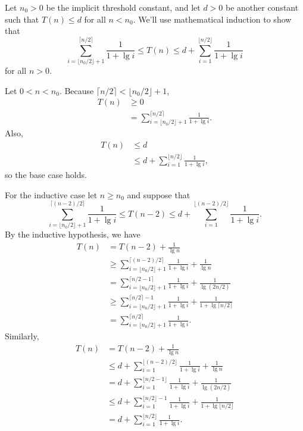 Let $n_0>0$ be the implicit threshold constant, and let $d>0$ be another constant such that $T(n)\le d$ for all $n<n_0$.
We'll use mathematical induction to show that
\[
    \sum_{i=\lfloor n_0/2\rfloor+1}^{\lceil n/2\rceil}\frac{1}{1+\lg i} \le T(n) \le d+\sum_{i=1}^{\lfloor n/2\rfloor}\frac{1}{1+\lg i}
\]
for all $n>0$.

Let $0<n<n_0$.
Because $\lceil n/2\rceil<\lfloor n_0/2\rfloor+1$,
\begin{align*}
    T(n) &\ge 0 \\
    &= \sum_{i=\lfloor n_0/2\rfloor+1}^{\lceil n/2\rceil}\frac{1}{1+\lg i}.
\end{align*}
Also,
\begin{align*}
    T(n) &\le d \\
    &\le d+\sum_{i=1}^{\lfloor n/2\rfloor}\frac{1}{1+\lg i},
\end{align*}
so the base case holds.

For the inductive case let $n\ge n_0$ and suppose that
\[
    \sum_{i=\lfloor n_0/2\rfloor+1}^{\lceil(n-2)/2\rceil}\frac{1}{1+\lg i} \le T(n-2) \le d+\sum_{i=1}^{\lfloor(n-2)/2\rfloor}\frac{1}{1+\lg i}.
\]
By the inductive hypothesis, we have
\begin{align*}
    T(n) &= T(n-2)+\frac{1}{\lg n} \\
    &\ge \sum_{i=\lfloor n_0/2\rfloor+1}^{\lceil(n-2)/2\rceil}\frac{1}{1+\lg i}+\frac{1}{\lg n} \\[1mm]
    &= \sum_{i=\lfloor n_0/2\rfloor+1}^{\lceil n/2-1\rceil}\frac{1}{1+\lg i}+\frac{1}{\lg(2n/2)} \\[1mm]
    &\ge \sum_{i=\lfloor n_0/2\rfloor+1}^{\lceil n/2\rceil-1}\frac{1}{1+\lg i}+\frac{1}{1+\lg\lceil n/2\rceil} \\[1mm]
    &= \sum_{i=\lfloor n_0/2\rfloor+1}^{\lceil n/2\rceil}\frac{1}{1+\lg i}.
\end{align*}
Similarly,
\begin{align*}
    T(n) &= T(n-2)+\frac{1}{\lg n} \\
    &\le d+\sum_{i=1}^{\lfloor(n-2)/2\rfloor}\frac{1}{1+\lg i}+\frac{1}{\lg n} \\[1mm]
    &= d+\sum_{i=1}^{\lfloor n/2-1\rfloor}\frac{1}{1+\lg i}+\frac{1}{\lg(2n/2)} \\[1mm]
    &\le d+\sum_{i=1}^{\lfloor n/2\rfloor-1}\frac{1}{1+\lg i}+\frac{1}{1+\lg\lfloor n/2\rfloor} \\[1mm]
    &= d+\sum_{i=1}^{\lfloor n/2\rfloor}\frac{1}{1+\lg i}.
\end{align*}


